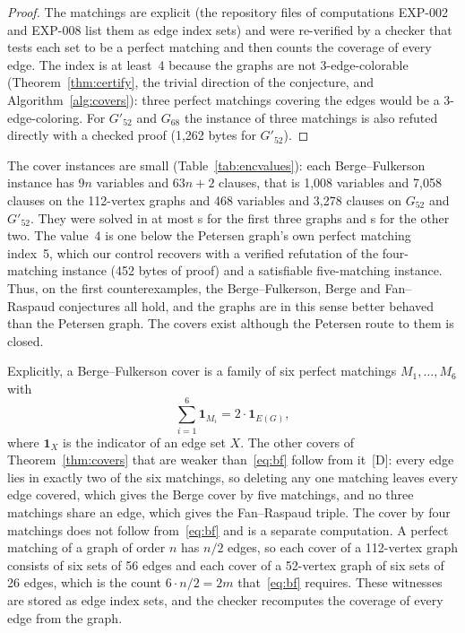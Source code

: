 \documentclass[11pt]{article}
\theoremstyle{definition}
\theoremstyle{remark}
\newcommand{\Gfty}{G_{52}}
\newcommand{\Gftyb}{G'_{52}}
\newcommand{\Gsix}{G_{68}}
\newcommand{\dd}{\textup{[D]}}
\begin{document}
\begin{proof}
The matchings are explicit (the repository files of computations EXP-002 and EXP-008
list them as edge index sets) and were re-verified by a checker that tests each set to be a perfect
matching and then counts the coverage of every edge. The index is at least~4 because the graphs
are not 3-edge-colorable (Theorem~\ref{thm:certify}, the trivial direction of the conjecture, and
Algorithm~\ref{alg:covers}): three perfect matchings covering the edges would be a 3-edge-coloring.
For $\Gftyb$ and $\Gsix$ the instance of three matchings is also refuted directly with a checked
proof (1{,}262 bytes for $\Gftyb$).
\end{proof}

The cover instances are small (Table~\ref{tab:encvalues}): each Berge--Fulkerson instance has
$9n$ variables and $63n+2$ clauses, that is 1{,}008 variables and 7{,}058 clauses on the 112-vertex
graphs and 468 variables and 3{,}278 clauses on $\Gfty$ and $\Gftyb$. They were solved in at most
\CoverMaxA{} s for the first three graphs and \CoverMaxB{} s for the other two. The value~4 is one
below the Petersen graph's own perfect matching index~5, which our control recovers with a verified
refutation of the four-matching instance (452 bytes of proof) and a satisfiable five-matching
instance. Thus, on the first counterexamples, the Berge--Fulkerson, Berge and Fan--Raspaud
conjectures all hold, and the graphs are in this sense better behaved than the Petersen graph. The covers exist although the
Petersen route to them is closed.

Explicitly, a Berge--Fulkerson cover is a family of six perfect matchings $M_1,\dots,M_6$ with
\begin{equation}\label{eq:bf}
\sum_{i=1}^{6} \mathbf 1_{M_i} = 2\cdot \mathbf 1_{E(G)},
\end{equation}
where $\mathbf 1_X$ is the indicator of an edge set $X$. The other covers of Theorem~\ref{thm:covers}
that are weaker than~\eqref{eq:bf} follow from it~\dd{}: every edge lies in exactly two of the six
matchings, so deleting any one matching leaves every edge covered, which gives the Berge cover by
five matchings, and no three matchings share an edge, which gives the Fan--Raspaud triple. The cover
by four matchings does not follow from~\eqref{eq:bf} and is a separate computation. A perfect matching
of a graph of order $n$ has $n/2$ edges, so each cover of a 112-vertex graph consists of six sets of
56 edges and each cover of a 52-vertex graph of six sets of 26 edges, which is the count $6 \cdot n/2 =
2m$ that~\eqref{eq:bf} requires. These witnesses are stored as edge index sets, and the checker
recomputes the coverage of every edge from the graph.
\end{document}
